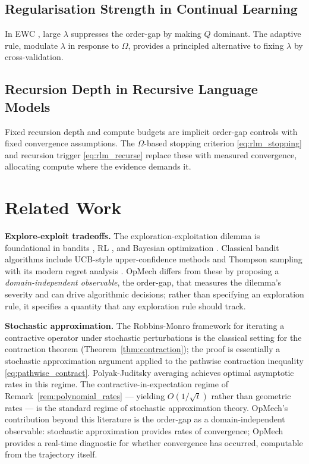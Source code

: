 \documentclass[12pt,a4paper]{article}
\newcommand{\Ogap}{\Omega}
\begin{document}
\subsection{Regularisation Strength in Continual Learning}
\label{sec:hp_cl}

In EWC \citep{kirkpatrick2017ewc}, large $\lambda$ suppresses the order-gap
by making $Q$ dominant. The adaptive rule, modulate $\lambda$ in response to
$\Ogap$, provides a principled alternative to fixing $\lambda$ by
cross-validation.

\subsection{Recursion Depth in Recursive Language Models}
\label{sec:hp_rlm}

Fixed recursion depth and compute budgets are implicit order-gap controls with
fixed convergence assumptions. The $\Ogap$-based stopping criterion
\eqref{eq:rlm_stopping} and recursion trigger \eqref{eq:rlm_recurse} replace
these with measured convergence, allocating compute where the evidence demands
it.

\section{Related Work}
\label{sec:related}

\textbf{Explore-exploit tradeoffs.}
The exploration-exploitation dilemma is foundational in bandits
\citep{lai1985bandit,lattimore2020bandit}, RL \citep{sutton2018rl}, and
Bayesian optimization \citep{srinivas2010gp}. Classical bandit algorithms
include UCB-style upper-confidence methods \citep{kaufmann2012bayesian} and
Thompson sampling with its modern regret analysis
\citep{russo2014ts}. OpMech differs from these by proposing a
\emph{domain-independent observable}, the order-gap, that measures the
dilemma's severity and can drive algorithmic decisions; rather than
specifying an exploration rule, it specifies a quantity that any
exploration rule should track.

\textbf{Stochastic approximation.}
The Robbins-Monro framework
\citep{robbins1951stochastic,borkar2008stochastic} for iterating a contractive
operator under stochastic perturbations is the classical setting for the
contraction theorem (Theorem~\ref{thm:contraction}); the proof is essentially
a stochastic approximation argument applied to the pathwise contraction
inequality \eqref{eq:pathwise_contract}. Polyak-Juditsky averaging
\citep{polyak1992averaging} achieves optimal asymptotic rates in this regime.
The contractive-in-expectation regime of
Remark~\ref{rem:polynomial_rates} — yielding $O(1/\sqrt{t})$ rather than
geometric rates — is the standard regime of stochastic approximation theory.
OpMech's contribution beyond this literature is the order-gap as a
domain-independent observable: stochastic approximation provides rates of
convergence; OpMech provides a real-time diagnostic for whether convergence
has occurred, computable from the trajectory itself.
\end{document}
